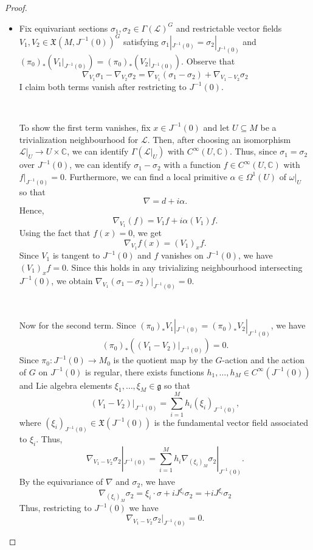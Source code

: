 \documentclass[10pt,a4paper]{amsart}
\newcommand{\bC}{\mathbb{C}}
\newcommand{\mfX}{\mathfrak{X}}
\newcommand{\mfg}{\mathfrak{g}}
\begin{document}
\begin{proof}
\begin{itemize}
    \item[(i)] Fix equivariant sections $\sigma_1,\sigma_2\in\Gamma(\mathcal{L})^G$ and restrictable vector fields $V_1,V_2\in\mfX(M,J^{-1}(0))^G$ satisfying $\sigma_1|_{J^{-1}(0)}=\sigma_2|_{J^{-1}(0)}$ and $(\pi_0)_*(V_1|_{J^{-1}(0)})=(\pi_0)_*(V_2|_{J^{-1}(0)})$. Observe that
    $$
    \nabla_{V_1}\sigma_1-\nabla_{V_2}\sigma_2=\nabla_{V_1}(\sigma_1-\sigma_2)+\nabla_{V_1-V_2}\sigma_2
    $$
    I claim both terms vanish after restricting to $J^{-1}(0)$. 

    \

    To show the first term vanishes, fix $x\in J^{-1}(0)$ and let $U\subseteq M$ be a trivialization neighbourhood for $\mathcal{L}$. Then, after choosing an isomorphism $\mathcal{L}|_U\to U\times \bC$, we can identify $\Gamma(\mathcal{L}|_U)$ with $C^\infty(U,\bC)$. Thus, since $\sigma_1=\sigma_2$ over $J^{-1}(0)$, we can identify $\sigma_1-\sigma_2$ with a function $f\in C^\infty(U,\bC)$ with $f|_{J^{-1}(0)}=0$. Furthermore, we can find a local primitive $\alpha\in\Omega^1(U)$ of $\omega|_U$ so that
    $$
    \nabla=d+i \alpha.
    $$
    Hence, 
    $$
    \nabla_{V_1}(f)=V_1f+i \alpha(V_1)f.
    $$
    Using the fact that $f(x)=0$, we get
    $$
    \nabla_{V_1}f(x)=(V_1)_xf.
    $$
    Since $V_1$ is tangent to $J^{-1}(0)$ and $f$ vanishes on $J^{-1}(0)$, we have $(V_1)_xf=0$. Since this holds in any trivializing neighbourhood intersecting $J^{-1}(0)$, we obtain $\nabla_{V_1}(\sigma_1-\sigma_2)|_{J^{-1}(0)}=0$.

    \

    Now for the second term. Since $(\pi_0)_*V_1|_{J^{-1}(0)}=(\pi_0)_*V_2|_{J^{-1}(0)}$, we have
    $$
    (\pi_0)_*((V_1-V_2)|_{J^{-1}(0)})=0.
    $$
    Since $\pi_0:J^{-1}(0)\to M_0$ is the quotient map by the $G$-action and the action of $G$ on $J^{-1}(0)$ is regular, there exists functions $h_1,\dots,h_M\in C^\infty(J^{-1}(0))$ and Lie algebra elements $\xi_1,\dots,\xi_M\in\mfg$ so that
    $$
    (V_1-V_2)|_{J^{-1}(0)}=\sum_{i=1}^M h_i (\xi_i)_{J^{-1}(0)},
    $$
    where $(\xi_i)_{J^{-1}(0)}\in \mfX(J^{-1}(0))$ is the fundamental vector field associated to $\xi_i$. Thus,
    $$
    \nabla_{V_1-V_2}\sigma_2|_{J^{-1}(0)}=\sum_{i=1}^Mh_i\nabla_{(\xi_i)_M}\sigma_2|_{J^{-1}(0)}.
    $$
    By the equivariance of $\nabla$ and $\sigma_2$, we have
    $$
    \nabla_{(\xi_i)_M}\sigma_2=\xi_i\cdot \sigma+i J^{\xi_i}\sigma_2=+i J^{\xi_i}\sigma_2
    $$
    Thus, restricting to $J^{-1}(0)$ we have
    $$
    \nabla_{V_1-V_2}\sigma_2|_{J^{-1}(0)}=0.
    $$


\end{itemize}
\end{proof}
\end{document}
